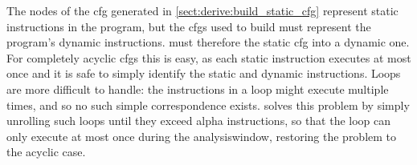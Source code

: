 The nodes of the \gls{cfg} generated in
\autoref{sect:derive:build_static_cfg} represent static instructions
in the program, but the \glspl{cfg} used to build {\StateMachines}
must represent the program's dynamic instructions.  {\Technique} must
therefore the static \gls{cfg} into a dynamic one.  For completely
acyclic \glspl{cfg} this is easy, as each static instruction executes
at most once and it is safe to simply identify the static and dynamic
instructions.  Loops are more difficult to handle: the instructions in
a loop might execute multiple times, and so no such simple
correspondence exists.  {\Technique} solves this problem by simply
unrolling such loops until they exceed \gls{alpha} instructions, so
that the loop can only execute at most once during the
\gls{analysiswindow}, restoring the problem to the acyclic case.

